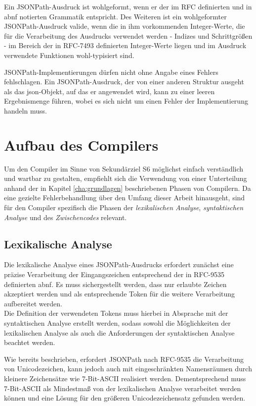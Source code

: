 \documentclass[oneside]{ausarbeitung}
\begin{document}
Ein JSONPath-Ausdruck ist wohlgeformt, wenn er der im RFC definierten und in \ac{abnf} notierten Grammatik entspricht. Des Weiteren ist ein wohlgeformter JSONPath-Ausdruck valide, wenn die in ihm vorkommenden Integer-Werte, die für die Verarbeitung des Ausdrucks verwendet werden - Indizes und Schrittgrößen - im Bereich der in RFC-7493 definierten Integer-Werte liegen und im Ausdruck verwendete Funktionen wohl-typisiert sind. 
	
JSONPath-Implementierungen dürfen nicht ohne Angabe eines Fehlers fehlschlagen. Ein JSONPath-Ausdruck, der von einer anderen Struktur ausgeht als das \ac{json}-Objekt, auf das er angewendet wird, kann zu einer leeren Ergebnismenge führen, wobei es sich nicht um einen Fehler der Implementierung handeln muss.
	
	
	
\section{Aufbau des Compilers}

Um den Compiler im Sinne von Sekundärziel S6 möglichst einfach verständlich und wartbar zu gestalten, empfiehlt sich die Verwendung von einer Unterteilung anhand der in Kapitel \ref{cha:grundlagen} beschriebenen Phasen von Compilern. Da eine gezielte Fehlerbehandlung über den Umfang dieser Arbeit hinausgeht, sind für den Compiler spezifisch die Phasen der \textit{lexikalischen Analyse}, \textit{syntaktischen Analyse} und des \textit{Zwischencodes} relevant. 


	
\subsection{Lexikalische Analyse}

Die lexikalische Analyse eines JSONPath-Ausdrucks erfordert zunächst eine präzise Verarbeitung der Eingangszeichen entsprechend der in RFC-9535 definierten \ac{abnf}. Es muss sichergestellt werden, dass nur erlaubte Zeichen akzeptiert werden und als entsprechende Token für die weitere Verarbeitung aufbereitet werden. \\
Die Definition der verwendeten Tokens muss hierbei in Absprache mit der syntaktischen Analyse erstellt werden, sodass sowohl die Möglichkeiten der lexikalischen Analyse als auch die Anforderungen der syntaktischen Analyse beachtet werden.

\pagebreak

Wie bereits beschrieben, erfordert JSONPath nach RFC-9535 die Verarbeitung von Unicodezeichen, kann jedoch auch mit eingeschränkten Namensräumen durch kleinere Zeichensätze wie 7-Bit-ASCII realisiert werden. Dementsprechend muss 7-Bit-ASCII als Mindestmaß von der lexikalischen Analyse verarbeitet werden können und eine Lösung für den größeren Unicodezeichensatz gefunden werden. 
\end{document}
